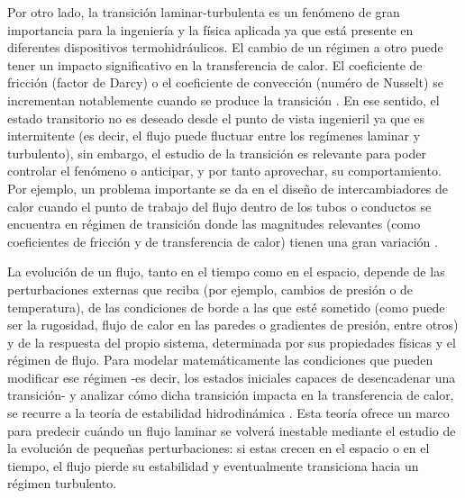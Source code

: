 Por otro lado, la transición laminar-turbulenta es un fenómeno de gran importancia para la ingeniería y la física aplicada ya que está presente en diferentes dispositivos termohidráulicos. El cambio de un régimen a otro puede tener un impacto significativo en la transferencia de calor. El coeficiente de fricción (factor de Darcy) o el coeficiente de convección (numéro de Nusselt) se incrementan notablemente cuando se produce la transición \cite{incropera,white}. En ese sentido, el estado transitorio no es deseado desde el punto de vista ingenieril ya que es intermitente (es decir, el flujo puede fluctuar entre los regímenes laminar y turbulento), sin embargo, el estudio de la transición es relevante para poder controlar el fenómeno o anticipar, y por tanto aprovechar, su comportamiento. Por ejemplo, un problema importante se da en el diseño de intercambiadores de calor cuando el punto de trabajo del flujo dentro de los tubos o conductos se encuentra en régimen de transición donde las magnitudes relevantes (como coeficientes de fricción y de transferencia de calor) tienen una gran variación \cite{ghajar2019heat}.

La evolución de un flujo, tanto en el tiempo como en el espacio, depende de las perturbaciones externas que reciba (por ejemplo, cambios de presión o de temperatura), de las condiciones de borde a las que esté sometido (como puede ser la rugosidad, flujo de calor en las paredes o gradientes de presión, entre otros) y de la respuesta del propio sistema, determinada por sus propiedades físicas y el régimen de flujo. Para modelar matemáticamente las condiciones que pueden modificar ese régimen -es decir, los estados iniciales capaces de desencadenar una transición- y analizar cómo dicha transición impacta en la transferencia de calor, se recurre a la teoría de estabilidad hidrodinámica \cite{schmid}. Esta teoría ofrece un marco para predecir cuándo un flujo laminar se volverá inestable mediante el estudio de la evolución de pequeñas perturbaciones: si estas crecen en el espacio o en el tiempo, el flujo pierde su estabilidad y eventualmente transiciona hacia un régimen turbulento.

